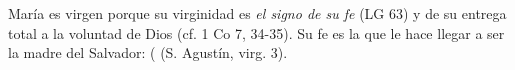	 María es virgen porque su virginidad es \emph{el signo de su fe}  (LG 63) y de su entrega total a la voluntad de Dios (cf. 1 Co 7, 34-35). Su fe es la que le hace llegar a ser la madre del Salvador:  ( (S. Agustín, virg. 3).